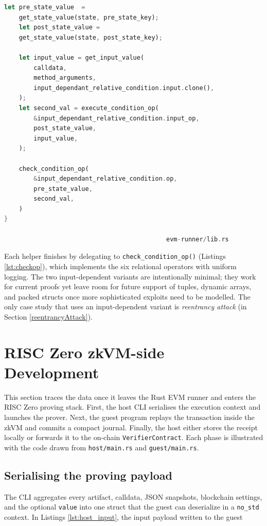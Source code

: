 \begin{enumerate}
\begin{lstlisting}[caption={[check\_input\_dependant\_relative\_condition]},
                   label={lst:idrelative},language=Rust]
    let pre_state_value  = 
    get_state_value(state, pre_state_key);
    let post_state_value = 
    get_state_value(state, post_state_key);

    let input_value = get_input_value(
        calldata,
        method_arguments,
        input_dependant_relative_condition.input.clone(),
    );
    let second_val = execute_condition_op(
        &input_dependant_relative_condition.input_op,
        post_state_value,
        input_value,
    );

    check_condition_op(
        &input_dependant_relative_condition.op,
        pre_state_value,
        second_val,
    )
}

                                            evm-runner/lib.rs
\end{lstlisting}
\end{enumerate}

Each helper finishes by delegating to \texttt{check\_condition\_op()} (Listings \ref{lst:checkop}), which implements the six relational operators with uniform logging. The two input-dependent variants are intentionally minimal; they work for current proofs yet leave room for future support of tuples, dynamic arrays, and packed structs once more sophisticated exploits need to be modelled. The only case study that uses an input-dependent variant is \textit{reentrancy attack} (in Section \ref{reentrancyAttack}).

\section{RISC Zero zkVM-side Development}

This section traces the data once it leaves the Rust EVM runner and enters the RISC Zero proving stack. First, the host CLI serialises the execution context and launches the prover. Next, the guest program replays the transaction inside the zkVM and commits a compact journal. Finally, the host either stores the receipt locally or forwards it to the on-chain \texttt{VerifierContract}. Each phase is illustrated with the code drawn from \texttt{host/main.rs} and \texttt{guest/main.rs}.

\subsection{Serialising the proving payload}

The CLI aggregates every artifact, calldata, JSON snapshots, blockchain settings, and the optional \texttt{value} into one struct that the guest can deserialize in a \texttt{no\_std} context. In Listings \ref{lst:host_input}, the input payload written to the guest


